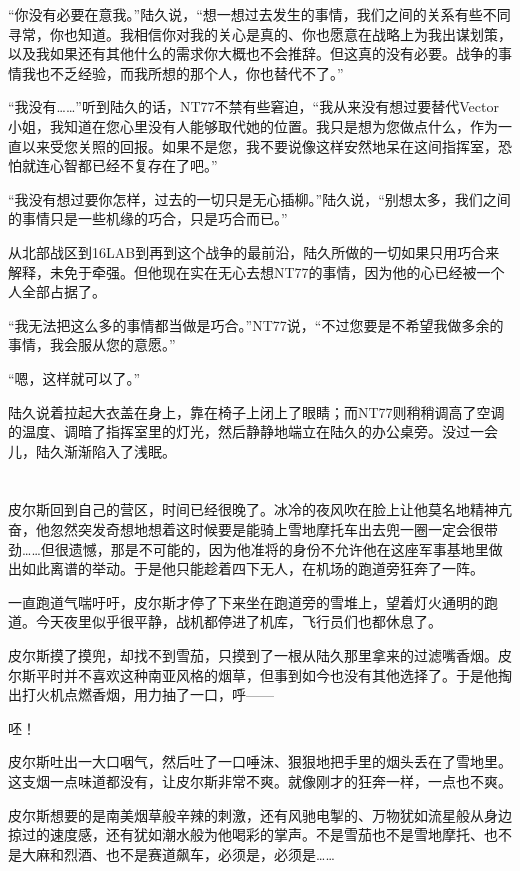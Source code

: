 “你没有必要在意我。”陆久说，“想一想过去发生的事情，我们之间的关系有些不同寻常，你也知道。我相信你对我的关心是真的、你也愿意在战略上为我出谋划策，以及我如果还有其他什么的需求你大概也不会推辞。但这真的没有必要。战争的事情我也不乏经验，而我所想的那个人，你也替代不了。”

“我没有……”听到陆久的话，NT77不禁有些窘迫，“我从来没有想过要替代Vector小姐，我知道在您心里没有人能够取代她的位置。我只是想为您做点什么，作为一直以来受您关照的回报。如果不是您，我不要说像这样安然地呆在这间指挥室，恐怕就连心智都已经不复存在了吧。”

“我没有想过要你怎样，过去的一切只是无心插柳。”陆久说，“别想太多，我们之间的事情只是一些机缘的巧合，只是巧合而已。”

从北部战区到16LAB到再到这个战争的最前沿，陆久所做的一切如果只用巧合来解释，未免于牵强。但他现在实在无心去想NT77的事情，因为他的心已经被一个人全部占据了。

“我无法把这么多的事情都当做是巧合。”NT77说，“不过您要是不希望我做多余的事情，我会服从您的意愿。”

“嗯，这样就可以了。”

陆久说着拉起大衣盖在身上，靠在椅子上闭上了眼睛；而NT77则稍稍调高了空调的温度、调暗了指挥室里的灯光，然后静静地端立在陆久的办公桌旁。没过一会儿，陆久渐渐陷入了浅眠。

\section*{}

皮尔斯回到自己的营区，时间已经很晚了。冰冷的夜风吹在脸上让他莫名地精神亢奋，他忽然突发奇想地想着这时候要是能骑上雪地摩托车出去兜一圈一定会很带劲……但很遗憾，那是不可能的，因为他准将的身份不允许他在这座军事基地里做出如此离谱的举动。于是他只能趁着四下无人，在机场的跑道旁狂奔了一阵。

一直跑道气喘吁吁，皮尔斯才停了下来坐在跑道旁的雪堆上，望着灯火通明的跑道。今天夜里似乎很平静，战机都停进了机库，飞行员们也都休息了。

皮尔斯摸了摸兜，却找不到雪茄，只摸到了一根从陆久那里拿来的过滤嘴香烟。皮尔斯平时并不喜欢这种南亚风格的烟草，但事到如今也没有其他选择了。于是他掏出打火机点燃香烟，用力抽了一口，呼——

呸！

皮尔斯吐出一大口咽气，然后吐了一口唾沫、狠狠地把手里的烟头丢在了雪地里。这支烟一点味道都没有，让皮尔斯非常不爽。就像刚才的狂奔一样，一点也不爽。

皮尔斯想要的是南美烟草般辛辣的刺激，还有风驰电掣的、万物犹如流星般从身边掠过的速度感，还有犹如潮水般为他喝彩的掌声。不是雪茄也不是雪地摩托、也不是大麻和烈酒、也不是赛道飙车，必须是，必须是……

